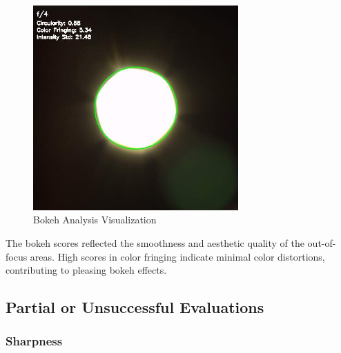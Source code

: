 \begin{figure}[H]
    \centering
    \includegraphics[width=0.7\textwidth]{Images/bokeh_analysis_20241212_234642.jpg}
    \caption{Bokeh Analysis Visualization}
    \label{fig:bokeh_visualization}
\end{figure}

The bokeh scores reflected the smoothness and aesthetic quality of the out-of-focus areas. High scores in color fringing indicate minimal color distortions, contributing to pleasing bokeh effects.

\subsection{Partial or Unsuccessful Evaluations}

\subsubsection{Sharpness}
\begin{table}[H]
    \centering
    \caption{Sharpness Assessment Scores}
    \label{tab:sharpness_scores}
\end{table}

